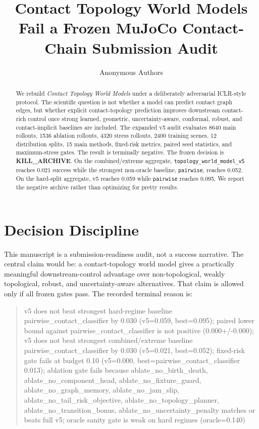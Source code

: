 \documentclass{article}
\title{Contact Topology World Models Fail a Frozen MuJoCo Contact-Chain Submission Audit}
\author{Anonymous Authors}
\begin{document}
\maketitle

\begin{abstract}
We rebuild \emph{Contact Topology World Models} under a deliberately adversarial ICLR-style protocol. The scientific question is not whether a model can predict contact graph edges, but whether explicit contact-topology prediction improves downstream contact-rich control once strong learned, geometric, uncertainty-aware, conformal, robust, and contact-implicit baselines are included. The expanded v5 audit evaluates 8640 main rollouts, 1536 ablation rollouts, 4320 stress rollouts, 2400 training scenes, 12 distribution splits, 15 main methods, fixed-risk metrics, paired seed statistics, and maximum-stress gates. The result is terminally negative. The frozen decision is \textbf{KILL\_ARCHIVE}. On the combined/extreme aggregate, \texttt{topology\_world\_model\_v5} reaches 0.021 success while the strongest non-oracle baseline, \texttt{pairwise}, reaches 0.052. On the hard-split aggregate, v5 reaches 0.059 while \texttt{pairwise} reaches 0.095. We report the negative archive rather than optimizing for pretty results.
\end{abstract}

\section{Decision Discipline}
This manuscript is a submission-readiness audit, not a success narrative. The central claim would be: a contact-topology world model gives a practically meaningful downstream-control advantage over non-topological, weakly topological, robust, and uncertainty-aware alternatives. That claim is allowed only if all frozen gates pass. The recorded terminal reason is:

\begin{quote}\small
v5 does not beat strongest hard-regime baseline pairwise\_contact\_classifier by 0.030 (v5=0.059, best=0.095); paired lower bound against pairwise\_contact\_classifier is not positive (0.000+/-0.000); v5 does not beat strongest combined/extreme baseline pairwise\_contact\_classifier by 0.030 (v5=0.021, best=0.052); fixed-risk gate fails at budget 0.10 (v5=0.000, best=pairwise\_contact\_classifier 0.013); ablation gate fails because ablate\_no\_birth\_death, ablate\_no\_component\_head, ablate\_no\_fixture\_guard, ablate\_no\_graph\_memory, ablate\_no\_jam\_slip, ablate\_no\_tail\_risk\_objective, ablate\_no\_topology\_planner, ablate\_no\_transition\_bonus, ablate\_no\_uncertainty\_penalty matches or beats full v5; oracle sanity gate is weak on hard regimes (oracle=0.140)
\end{quote}
\end{document}
